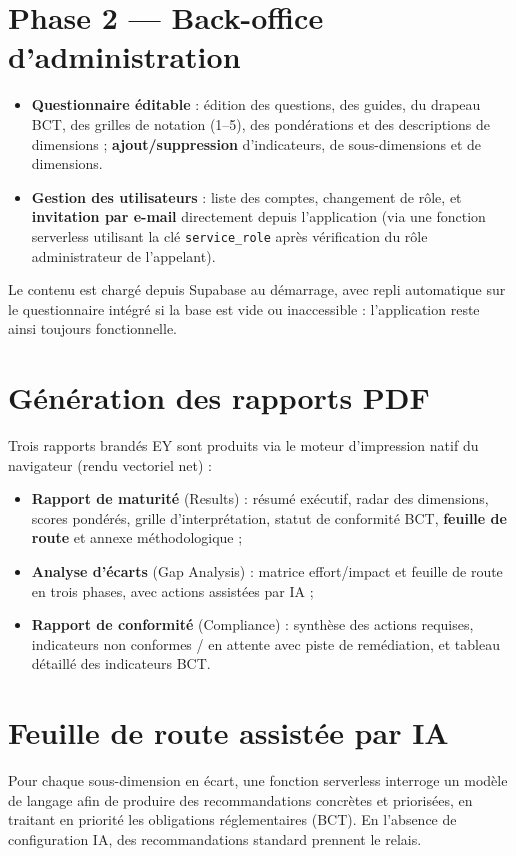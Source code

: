 \documentclass[11pt,a4paper]{report}
\begin{document}
\section{Phase 2 — Back-office d'administration}
\begin{itemize}[noitemsep]
  \item \textbf{Questionnaire éditable} : édition des questions, des guides, du
  drapeau BCT, des grilles de notation (1--5), des pondérations et des
  descriptions de dimensions ; \textbf{ajout/suppression} d'indicateurs, de
  sous-dimensions et de dimensions.
  \item \textbf{Gestion des utilisateurs} : liste des comptes, changement de
  rôle, et \textbf{invitation par e-mail} directement depuis l'application
  (via une fonction serverless utilisant la clé \texttt{service\_role} après
  vérification du rôle administrateur de l'appelant).
\end{itemize}

Le contenu est chargé depuis Supabase au démarrage, avec repli automatique sur le
questionnaire intégré si la base est vide ou inaccessible : l'application reste
ainsi toujours fonctionnelle.

\section{Génération des rapports PDF}
Trois rapports brandés EY sont produits via le moteur d'impression natif du
navigateur (rendu vectoriel net) :
\begin{itemize}[noitemsep]
  \item \textbf{Rapport de maturité} (Results) : résumé exécutif, radar des
  dimensions, scores pondérés, grille d'interprétation, statut de conformité
  BCT, \textbf{feuille de route} et annexe méthodologique ;
  \item \textbf{Analyse d'écarts} (Gap Analysis) : matrice effort/impact et
  feuille de route en trois phases, avec actions assistées par IA ;
  \item \textbf{Rapport de conformité} (Compliance) : synthèse des actions
  requises, indicateurs non conformes / en attente avec piste de remédiation,
  et tableau détaillé des indicateurs BCT.
\end{itemize}

\section{Feuille de route assistée par IA}
Pour chaque sous-dimension en écart, une fonction serverless interroge un modèle
de langage afin de produire des recommandations concrètes et priorisées, en
traitant en priorité les obligations réglementaires (BCT). En l'absence de
configuration IA, des recommandations standard prennent le relais.
\end{document}
